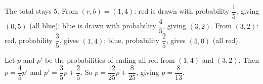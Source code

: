 The total stays $5$. From $(r,b)=(1,4)$: red is drawn with probability $\dfrac15$, giving $(0,5)$ (all blue); blue is drawn with probability $\dfrac45$, giving $(3,2)$. From $(3,2)$: red, probability $\dfrac35$, gives $(1,4)$; blue, probability $\dfrac25$, gives $(5,0)$ (all red).

Let $p$ and $p'$ be the probabilities of ending all red from $(1,4)$ and $(3,2)$. Then $p=\dfrac45p'$ and $p'=\dfrac35p+\dfrac25$. So $p=\dfrac{12}{25}p+\dfrac8{25}$, giving $p=\boxed{\dfrac8{13}}$.
